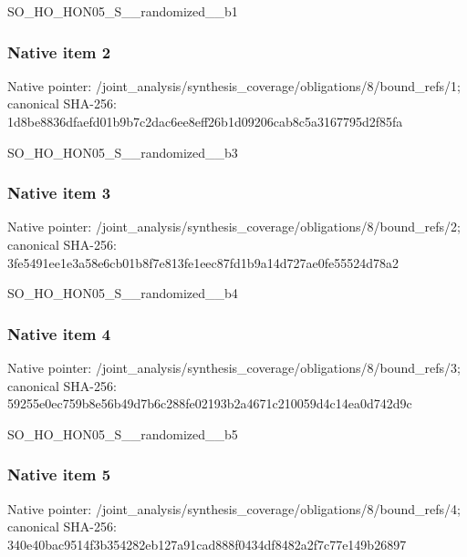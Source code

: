 \documentclass[10pt,a4paper]{article}
\begin{document}
\begingroup\raggedright\sloppy SO\_\allowbreak{}HO\_\allowbreak{}HON05\_\allowbreak{}S\_\allowbreak{}\_\allowbreak{}randomized\_\allowbreak{}\_\allowbreak{}b1\par\endgroup

\subsubsection{Native item 2}
Native pointer: /joint\_\allowbreak{}analysis/synthesis\_\allowbreak{}coverage/obligations/8/bound\_\allowbreak{}refs/1; canonical SHA-256: 1d8be8836dfaefd01b9b7c2dac6ee8eff26b1d09206cab8c5a3167795d2f85fa

\begingroup\raggedright\sloppy SO\_\allowbreak{}HO\_\allowbreak{}HON05\_\allowbreak{}S\_\allowbreak{}\_\allowbreak{}randomized\_\allowbreak{}\_\allowbreak{}b3\par\endgroup

\subsubsection{Native item 3}
Native pointer: /joint\_\allowbreak{}analysis/synthesis\_\allowbreak{}coverage/obligations/8/bound\_\allowbreak{}refs/2; canonical SHA-256: 3fe5491ee1e3a58e6cb01b8f7e813fe1eec87fd1b9a14d727ae0fe55524d78a2

\begingroup\raggedright\sloppy SO\_\allowbreak{}HO\_\allowbreak{}HON05\_\allowbreak{}S\_\allowbreak{}\_\allowbreak{}randomized\_\allowbreak{}\_\allowbreak{}b4\par\endgroup

\subsubsection{Native item 4}
Native pointer: /joint\_\allowbreak{}analysis/synthesis\_\allowbreak{}coverage/obligations/8/bound\_\allowbreak{}refs/3; canonical SHA-256: 59255e0ec759b8e56b49d7b6c288fe02193b2a4671c210059d4c14ea0d742d9c

\begingroup\raggedright\sloppy SO\_\allowbreak{}HO\_\allowbreak{}HON05\_\allowbreak{}S\_\allowbreak{}\_\allowbreak{}randomized\_\allowbreak{}\_\allowbreak{}b5\par\endgroup

\subsubsection{Native item 5}
Native pointer: /joint\_\allowbreak{}analysis/synthesis\_\allowbreak{}coverage/obligations/8/bound\_\allowbreak{}refs/4; canonical SHA-256: 340e40bac9514f3b354282eb127a91cad888f0434df8482a2f7c77e149b26897
\end{document}
